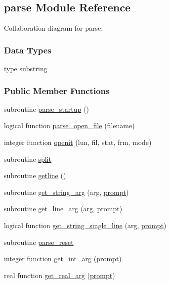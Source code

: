 \hypertarget{classparse}{\subsection{parse Module Reference}
\label{classparse}
}


Collaboration diagram for parse\-:
\subsubsection*{Data Types}
\begin{DoxyCompactItemize}
\item 
type \hyperlink{structparse_1_1substring}{substring}
\end{DoxyCompactItemize}
\subsubsection*{Public Member Functions}
\begin{DoxyCompactItemize}
\item 
subroutine \hyperlink{classparse_adb94cdc092b031413f8218d55f5c6fea}{parse\-\_\-startup} ()
\item 
logical function \hyperlink{classparse_a47fc9e589e366b44ddbdcc0a05ce0052}{parse\-\_\-open\-\_\-file} (filename)
\item 
integer function \hyperlink{classparse_a0cc676b15a8ab0f5158f0f51a0f30ebf}{openit} (lun, fil, stat, frm, mode)
\item 
subroutine \hyperlink{classparse_a431f0c36309d6174287bde5e4d0e78e8}{split}
\item 
subroutine \hyperlink{classparse_a362c49175b5f2d7f582dde6cb7b871af}{getline} ()
\item 
subroutine \hyperlink{classparse_a17fdf061a0ee443c4a80c24d8e3cd11f}{get\-\_\-string\-\_\-arg} (arg, \hyperlink{qfep__bar_8f90_a897ce0488192cf7f2a3ca4d41e5d73e3}{prompt})
\item 
subroutine \hyperlink{classparse_a76068663dfa765e2a4d8e0f9bf4017a8}{get\-\_\-line\-\_\-arg} (arg, \hyperlink{qfep__bar_8f90_a897ce0488192cf7f2a3ca4d41e5d73e3}{prompt})
\item 
logical function \hyperlink{classparse_ac1030faa25daef8210640a1537597c25}{get\-\_\-string\-\_\-single\-\_\-line} (arg, \hyperlink{qfep__bar_8f90_a897ce0488192cf7f2a3ca4d41e5d73e3}{prompt})
\item 
subroutine \hyperlink{classparse_ab0b0c4663024ac8a04d78628109e5215}{parse\-\_\-reset}
\item 
integer function \hyperlink{classparse_a796a4266eea42a76292330425be4f9fe}{get\-\_\-int\-\_\-arg} (\hyperlink{qfep__bar_8f90_a897ce0488192cf7f2a3ca4d41e5d73e3}{prompt})
\item 
real function \hyperlink{classparse_a9941ab0c7c89dad4ed63753dda092274}{get\-\_\-real\-\_\-arg} (\hyperlink{qfep__bar_8f90_a897ce0488192cf7f2a3ca4d41e5d73e3}{prompt})
\end{DoxyCompactItemize}
